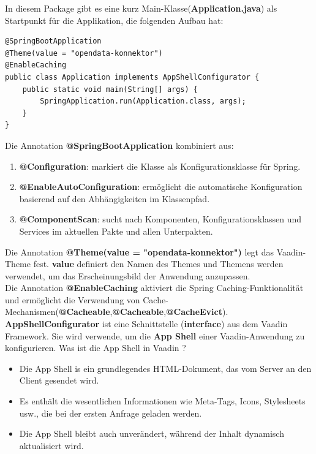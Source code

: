 \documentclass[a4paper,12pt]{scrreprt}
\begin{document}
In diesem Package gibt es eine kurz Main-Klasse(\textbf{Application.java}) als Startpunkt für die Applikation, die folgenden Aufbau hat: \\
\begin{lstlisting}
@SpringBootApplication
@Theme(value = "opendata-konnektor")
@EnableCaching
public class Application implements AppShellConfigurator {
	public static void main(String[] args) {
		SpringApplication.run(Application.class, args);
	}
}
\end{lstlisting}
	Die Annotation \textbf{@SpringBootApplication} kombiniert aus:
		\begin{enumerate}
			\item  \textbf{@Configuration}: markiert die Klasse als Konfigurationsklasse für Spring.
			\item  \textbf{@EnableAutoConfiguration}: ermöglicht die automatische Konfiguration basierend auf den Abhängigkeiten im Klassenpfad.
			\item  \textbf{@ComponentScan}: sucht nach Komponenten, Konfigurationsklassen und Services im aktuellen Pakte und allen Unterpakten.
		\end{enumerate}
	Die Annotation \textbf{@Theme(value = "opendata-konnektor")} legt das Vaadin-Theme fest. \textbf{value} definiert den Namen des Themes und Themens werden verwendet, um das Erscheinungsbild der Anwendung anzupassen.\\
	Die Annotation \textbf{@EnableCaching} aktiviert die Spring Caching-Funktionalität und ermöglicht die Verwendung von Cache-Mechanismen(\textbf{@Cacheable},\textbf{@Cacheable},\textbf{@CacheEvict}).\\
	\textbf{AppShellConfigurator} ist eine Schnittstelle (\textbf{interface}) aus dem Vaadin Framework. Sie wird verwende, um die \textbf{App Shell} einer Vaadin-Anwendung zu konfigurieren. Was ist die App Shell in Vaadin ?
	\begin{itemize}
		\item Die App Shell is ein grundlegendes HTML-Dokument, das vom Server an den Client gesendet wird.
		\item Es enthält die wesentlichen Informationen wie Meta-Tags, Icons, Stylesheets usw., die bei der ersten Anfrage geladen werden.
		\item Die App Shell bleibt auch unverändert, während der Inhalt dynamisch aktualisiert wird.
	\end{itemize}
	
\end{document}
